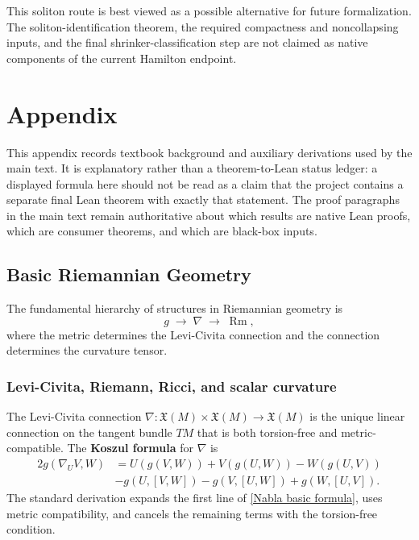\documentclass[11pt]{article}
\theoremstyle{plain}
\theoremstyle{definition}
\theoremstyle{remark}
\newcommand{\vspacesub}{\vspace{0pt}}
\newcommand{\Rm}{\operatorname{Rm}}
\begin{document}
This soliton route is best viewed as a possible alternative for future
formalization.  The soliton-identification theorem, the required compactness and
noncollapsing inputs, and the final shrinker-classification step are not claimed
as native components of the current Hamilton endpoint.

\newpage 

\section{Appendix}

This appendix records textbook background and auxiliary derivations used by the
main text.  It is explanatory rather than a theorem-to-Lean status ledger: a
displayed formula here should not be read as a claim that the project contains a
separate final Lean theorem with exactly that statement.  The proof paragraphs in
the main text remain authoritative about which results are native Lean proofs,
which are consumer theorems, and which are black-box inputs.

\subsection{Basic Riemannian Geometry}\label{subsec:BasicRiemGeom}

The fundamental hierarchy of structures in Riemannian geometry is
\[
g \;\longrightarrow\; \nabla \;\longrightarrow\; \Rm ,
\]
where the metric determines the Levi-Civita connection and the connection
determines the curvature tensor.

\subsubsection{Levi-Civita, Riemann, Ricci, and scalar curvature}

\vspacesub

The Levi-Civita connection
$\nabla: \mathfrak{X}(M) \times \mathfrak{X}(M) \to \mathfrak{X}(M)$
is the unique linear connection on the tangent bundle $TM$ that is both
torsion-free and metric-compatible.  The \textbf{Koszul formula} for
$\nabla$ is
\begin{align}
 2g\left(  \nabla_{U}V,W\right)   &  =U\left(  g\left(  V,W\right)  \right)
+V\left(  g\left(  U,W\right)  \right)  -W\left(  g\left(  U,V\right)  \right)
\nonumber \\
&   -g\left( U,  \left[  V,W\right] \right) -g\left( V, \left[  U,W\right]
\right)    + g\left( W, \left[  U,V\right]  \right)   .   \label{Nabla basic formula} 
\end{align}
The standard derivation expands the first line of
\eqref{Nabla basic formula}, uses metric compatibility, and cancels the
remaining terms with the torsion-free condition.
\end{document}
